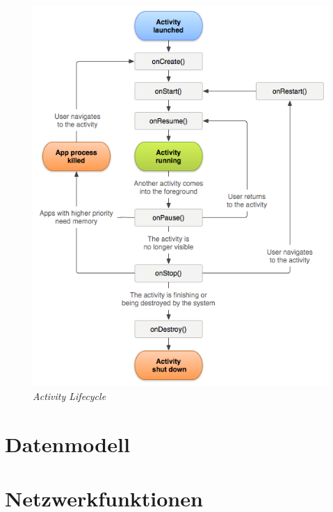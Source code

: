 \begin{figure}[ht]
\centering
\includegraphics[width=\textwidth]{../img/ActivityLifecycle.png}
\caption{\emph{Activity Lifecycle}}
\label{fig:activitylifecycle}
\end{figure}

\section{Datenmodell}
\label{sec:datenmodell}

\section{Netzwerkfunktionen}
\label{sec:netzwerkfunktionen}